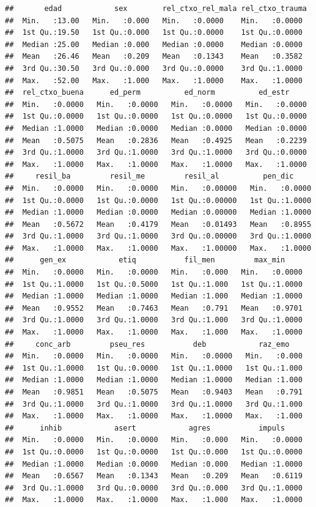 \documentclass[]{article}
\begin{document}
\begin{verbatim}
##       edad            sex        rel_ctxo_rel_mala rel_ctxo_trauma 
##  Min.   :13.00   Min.   :0.000   Min.   :0.0000    Min.   :0.0000  
##  1st Qu.:19.50   1st Qu.:0.000   1st Qu.:0.0000    1st Qu.:0.0000  
##  Median :25.00   Median :0.000   Median :0.0000    Median :0.0000  
##  Mean   :26.46   Mean   :0.209   Mean   :0.1343    Mean   :0.3582  
##  3rd Qu.:30.50   3rd Qu.:0.000   3rd Qu.:0.0000    3rd Qu.:1.0000  
##  Max.   :52.00   Max.   :1.000   Max.   :1.0000    Max.   :1.0000  
##  rel_ctxo_buena      ed_perm          ed_norm          ed_estr      
##  Min.   :0.0000   Min.   :0.0000   Min.   :0.0000   Min.   :0.0000  
##  1st Qu.:0.0000   1st Qu.:0.0000   1st Qu.:0.0000   1st Qu.:0.0000  
##  Median :1.0000   Median :0.0000   Median :0.0000   Median :0.0000  
##  Mean   :0.5075   Mean   :0.2836   Mean   :0.4925   Mean   :0.2239  
##  3rd Qu.:1.0000   3rd Qu.:1.0000   3rd Qu.:1.0000   3rd Qu.:0.0000  
##  Max.   :1.0000   Max.   :1.0000   Max.   :1.0000   Max.   :1.0000  
##     resil_ba         resil_me         resil_al          pen_dic      
##  Min.   :0.0000   Min.   :0.0000   Min.   :0.00000   Min.   :0.0000  
##  1st Qu.:0.0000   1st Qu.:0.0000   1st Qu.:0.00000   1st Qu.:1.0000  
##  Median :1.0000   Median :0.0000   Median :0.00000   Median :1.0000  
##  Mean   :0.5672   Mean   :0.4179   Mean   :0.01493   Mean   :0.8955  
##  3rd Qu.:1.0000   3rd Qu.:1.0000   3rd Qu.:0.00000   3rd Qu.:1.0000  
##  Max.   :1.0000   Max.   :1.0000   Max.   :1.00000   Max.   :1.0000  
##      gen_ex            etiq           fil_men         max_min      
##  Min.   :0.0000   Min.   :0.0000   Min.   :0.000   Min.   :0.0000  
##  1st Qu.:1.0000   1st Qu.:0.5000   1st Qu.:1.000   1st Qu.:1.0000  
##  Median :1.0000   Median :1.0000   Median :1.000   Median :1.0000  
##  Mean   :0.9552   Mean   :0.7463   Mean   :0.791   Mean   :0.9701  
##  3rd Qu.:1.0000   3rd Qu.:1.0000   3rd Qu.:1.000   3rd Qu.:1.0000  
##  Max.   :1.0000   Max.   :1.0000   Max.   :1.000   Max.   :1.0000  
##     conc_arb         pseu_res           deb            raz_emo     
##  Min.   :0.0000   Min.   :0.0000   Min.   :0.0000   Min.   :0.000  
##  1st Qu.:1.0000   1st Qu.:0.0000   1st Qu.:1.0000   1st Qu.:1.000  
##  Median :1.0000   Median :1.0000   Median :1.0000   Median :1.000  
##  Mean   :0.9851   Mean   :0.5075   Mean   :0.9403   Mean   :0.791  
##  3rd Qu.:1.0000   3rd Qu.:1.0000   3rd Qu.:1.0000   3rd Qu.:1.000  
##  Max.   :1.0000   Max.   :1.0000   Max.   :1.0000   Max.   :1.000  
##      inhib            asert            agres           impuls      
##  Min.   :0.0000   Min.   :0.0000   Min.   :0.000   Min.   :0.0000  
##  1st Qu.:0.0000   1st Qu.:0.0000   1st Qu.:0.000   1st Qu.:0.0000  
##  Median :1.0000   Median :0.0000   Median :0.000   Median :1.0000  
##  Mean   :0.6567   Mean   :0.1343   Mean   :0.209   Mean   :0.6119  
##  3rd Qu.:1.0000   3rd Qu.:0.0000   3rd Qu.:0.000   3rd Qu.:1.0000  
##  Max.   :1.0000   Max.   :1.0000   Max.   :1.000   Max.   :1.0000
\end{verbatim}
\end{document}
